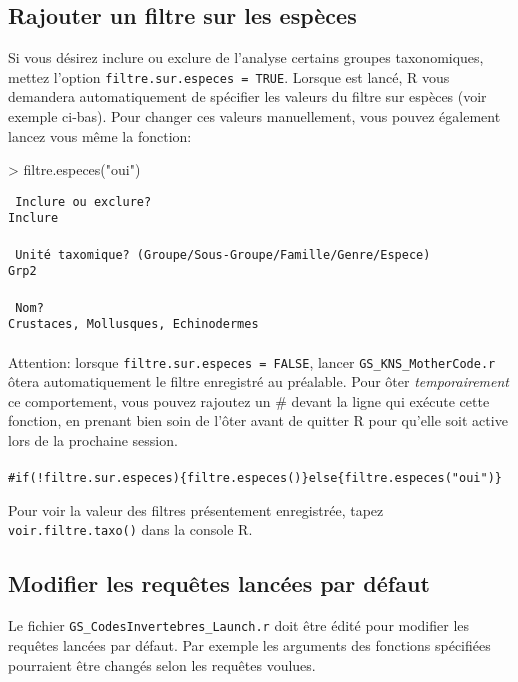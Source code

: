\documentclass{article}
\begin{document}
\subsection{Rajouter un filtre sur les espèces}
\label{filtre::sp}
Si vous désirez inclure ou exclure de l'analyse certains groupes
taxonomiques, mettez l'option \texttt{filtre.sur.especes =
  TRUE}. Lorsque \mcode {} est lancé, R vous
demandera automatiquement de spécifier les valeurs du filtre sur
espèces (voir exemple ci-bas). Pour changer ces valeurs manuellement,
vous pouvez également lancez
vous même la fonction:

\begin{Schunk}
\begin{Sinput}
> filtre.especes("oui")
\end{Sinput}
\end{Schunk}

\texttt{\color{MidnightBlue} Inclure ou exclure? } \\
\indent \indent \texttt{Inclure } \\
\\
\indent \texttt{\color{MidnightBlue} Unité taxomique? (Groupe/Sous-Groupe/Famille/Genre/Espece)} \\
\indent \indent \texttt{Grp2}\\
\\
\indent \texttt{\color{MidnightBlue} Nom?} \\
\indent \indent \texttt{Crustaces, Mollusques, Echinodermes}\\
\\

\noindent Attention: lorsque \texttt{filtre.sur.especes =
  FALSE}, lancer \texttt{GS\_KNS\_MotherCode.r} ôtera automatiquement
le filtre enregistré au préalable. Pour ôter \emph{temporairement} ce comportement,
vous pouvez rajoutez un \# devant la ligne qui exécute cette fonction,
en prenant bien soin de l'ôter avant de quitter R pour qu'elle soit
active lors de la prochaine session. \\
\\
\texttt{\#if(!filtre.sur.especes)\{filtre.especes()\}else\{filtre.especes("oui")\}}

Pour voir la valeur des filtres présentement enregistrée, tapez
\texttt{voir.filtre.taxo()} dans la console R.

\subsection{Modifier les requêtes lancées par défaut}
Le fichier \texttt{GS\_CodesInvertebres\_Launch.r} doit être édité
pour modifier les requêtes lancées par défaut. Par exemple les
arguments des fonctions spécifiées pourraient être changés selon les
requêtes voulues.
\end{document}
